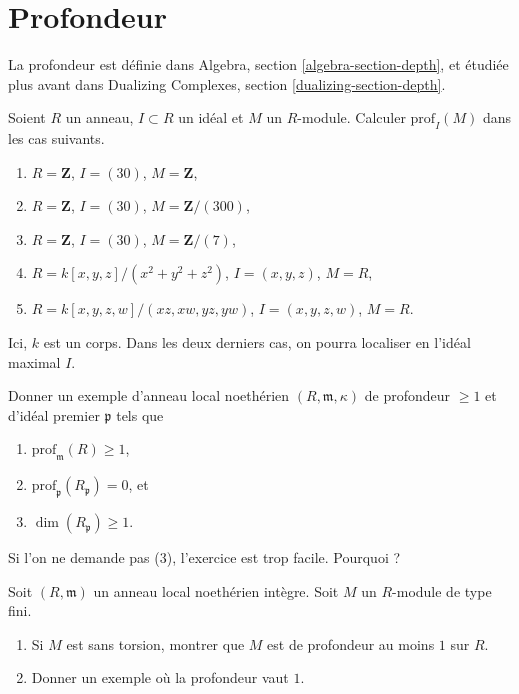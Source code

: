 \section{Profondeur}
\label{section-depth}

\noindent
La profondeur est définie dans Algebra, section \ref{algebra-section-depth},
et étudiée plus avant dans
Dualizing Complexes, section \ref{dualizing-section-depth}.

\begin{exercise}
\label{exercise-compute-depth}
Soient $R$ un anneau, $I \subset R$ un idéal et $M$ un $R$-module.
Calculer $\text{prof}_I(M)$ dans les cas suivants.
\begin{enumerate}
\item $R = \mathbf{Z}$, $I = (30)$, $M = \mathbf{Z}$,
\item $R = \mathbf{Z}$, $I = (30)$, $M = \mathbf{Z}/(300)$,
\item $R = \mathbf{Z}$, $I = (30)$, $M = \mathbf{Z}/(7)$,
\item $R = k[x, y, z]/(x^2 + y^2 + z^2)$, $I = (x, y, z)$, $M = R$,
\item $R = k[x, y, z, w]/(xz, xw, yz, yw)$, $I = (x, y, z, w)$,
$M = R$.
\end{enumerate}
Ici, $k$ est un corps. Dans les deux derniers cas, on pourra localiser
en l'idéal maximal $I$.
\end{exercise}

\begin{exercise}
\label{exercise-depth-not-inherited-localization}
Donner un exemple d'anneau local noethérien $(R, \mathfrak m, \kappa)$
de profondeur $\geq 1$ et d'idéal premier $\mathfrak p$ tels que
\begin{enumerate}
\item $\text{prof}_\mathfrak m(R) \geq 1$,
\item $\text{prof}_\mathfrak p(R_\mathfrak p) = 0$, et
\item $\dim(R_\mathfrak p) \geq 1$.
\end{enumerate}
Si l'on ne demande pas (3), l'exercice est trop facile. Pourquoi ?
\end{exercise}

\begin{exercise}
\label{exercise-depth-torsion-free}
Soit $(R, \mathfrak m)$ un anneau local noethérien intègre.
Soit $M$ un $R$-module de type fini.
\begin{enumerate}
\item Si $M$ est sans torsion, montrer que $M$ est de profondeur au moins $1$ sur $R$.
\item Donner un exemple où la profondeur vaut $1$.
\end{enumerate}
\end{exercise}

